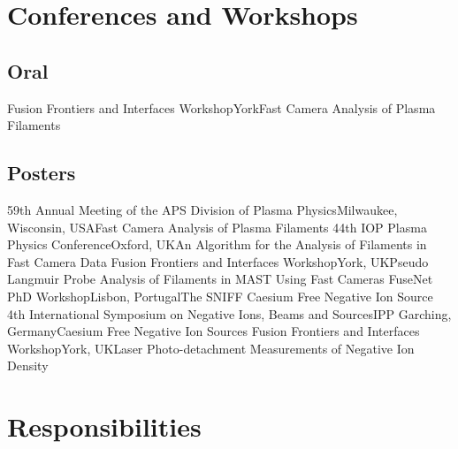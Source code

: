\documentclass[11pt,a4paper,sans]{moderncv}        %
\begin{document}

\section{Conferences and Workshops}
\subsection{Oral}
{Fusion Frontiers and Interfaces Workshop}{York}{\newline Fast Camera Analysis of Plasma Filaments}{}{}
\subsection{Posters}
{59th Annual Meeting of the APS Division of Plasma Physics}{\newline Milwaukee, Wisconsin, USA}{\newline Fast Camera Analysis of Plasma Filaments}{}
{}
{44th IOP Plasma Physics Conference}{Oxford, UK}{\newline An Algorithm for the Analysis of Filaments in Fast Camera Data}{}
{}
{Fusion Frontiers and Interfaces Workshop}{York, UK}{\newline Pseudo Langmuir Probe Analysis  of Filaments in MAST Using Fast Cameras}{}
{}
{FuseNet PhD Workshop}{Lisbon, Portugal}{\newline The SNIFF Caesium Free Negative Ion Source}{}
{}
{4th International Symposium on Negative Ions, Beams and Sources}{IPP Garching, Germany}{\newline Caesium Free Negative Ion Sources}{}
{}
{Fusion Frontiers and Interfaces Workshop}{York, UK}{\newline Laser Photo-detachment Measurements of Negative Ion Density}{}
{}

\section{Responsibilities}
\end{document}
